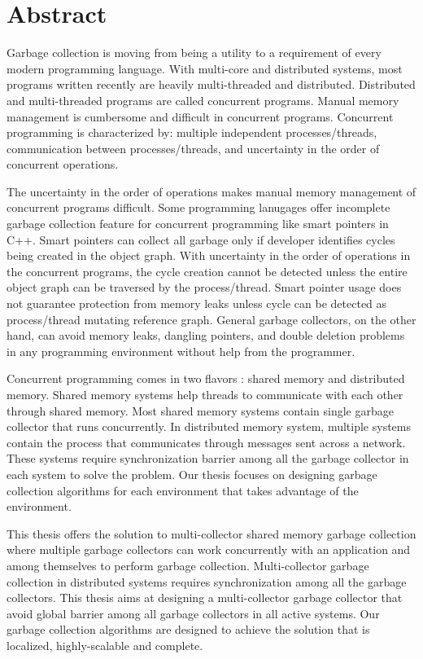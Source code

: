 \chapter*{Abstract}
\label{ch:abstract}
Garbage collection is moving from being a utility to a requirement of every modern programming language. 
With multi-core and distributed systems, most programs written recently are heavily multi-threaded and distributed. Distributed and multi-threaded programs are called concurrent programs. Manual memory management is cumbersome and difficult in concurrent programs.  Concurrent programming is characterized by: multiple independent processes/threads, communication between processes/threads, and uncertainty in the order of concurrent operations.

The uncertainty in the order of operations makes manual memory management of concurrent programs difficult. Some programming lanugages offer incomplete garbage collection feature for concurrent programming like smart pointers in C++.
Smart pointers can collect all garbage only if developer identifies cycles being created in the object graph. With uncertainty in the order of operations in the concurrent programs, the cycle creation cannot be detected unless the entire object graph can be traversed by the process/thread.
 Smart pointer usage does not guarantee protection from memory leaks unless cycle can be detected as process/thread mutating reference graph.
 General garbage collectors, on the other hand, can avoid memory leaks, dangling pointers, and double deletion problems in any programming environment without help from the programmer. 

Concurrent programming comes in two flavors : shared memory and distributed memory. Shared memory systems help threads to communicate with each other through shared memory. Most shared memory systems contain single garbage collector that runs concurrently. In distributed memory system, multiple systems contain the process that communicates through messages sent across a network. These systems require synchronization barrier among all the garbage collector in each system to solve the problem. Our thesis focuses on designing garbage collection algorithms for each environment that takes advantage of the environment. 

This thesis offers the solution to multi-collector shared memory garbage collection where multiple garbage collectors can work concurrently with an application and among themselves to perform garbage collection. Multi-collector garbage collection in distributed systems requires synchronization among all the garbage collectors. This thesis aims at designing a multi-collector garbage collector that avoid global barrier among all garbage collectors in all active systems. Our garbage collection algorithms are designed to achieve the solution that is localized, highly-scalable and complete.
